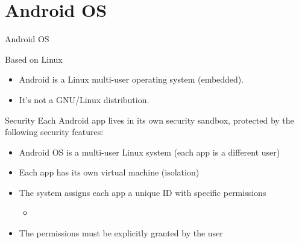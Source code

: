 \documentclass{beamer}
\begin{document}
\section{Android OS}

\begin{frame}{Android OS}
  \begin{block}{Based on Linux}
    \begin{itemize}
      \item Android is a Linux multi-user operating system (embedded).
      \item It's not a GNU/Linux distribution.
    \end{itemize}
  \end{block}
  \begin{block}{Security}
    Each Android app lives in its own security sandbox, protected by the following security features:
    \begin{itemize}
      \item Android OS is a multi-user Linux system (each app is a different user)
      \item Each app has its own virtual machine (isolation)
      \item The system assigns each app a unique ID with specific permissions
        \begin{itemize}
          \item {}
        \end{itemize}
      \item The permissions must be explicitly granted by the user 
    \end{itemize}
  \end{block}
\end{frame}
\end{document}
